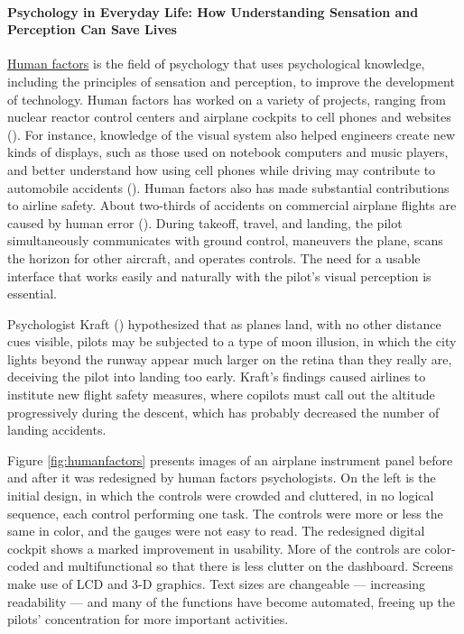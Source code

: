 \documentclass[
]{krantz}
\begin{document}
\paragraph*{Psychology in Everyday Life: How Understanding Sensation and Perception Can Save Lives}\label{psychology-in-everyday-life-how-understanding-sensation-and-perception-can-save-lives}

\hyperref[human-factors]{Human factors} is the field of psychology that uses psychological knowledge, including the principles of sensation and perception, to improve the development of technology. Human factors has worked on a variety of projects, ranging from nuclear reactor control centers and airplane cockpits to cell phones and websites (). For instance, knowledge of the visual system also helped engineers create new kinds of displays, such as those used on notebook computers and music players, and better understand how using cell phones while driving may contribute to automobile accidents (). Human factors also has made substantial contributions to airline safety. About two-thirds of accidents on commercial airplane flights are caused by human error (). During takeoff, travel, and landing, the pilot simultaneously communicates with ground control, maneuvers the plane, scans the horizon for other aircraft, and operates controls. The need for a usable interface that works easily and naturally with the pilot's visual perception is essential.

Psychologist Kraft () hypothesized that as planes land, with no other distance cues visible, pilots may be subjected to a type of moon illusion, in which the city lights beyond the runway appear much larger on the retina than they really are, deceiving the pilot into landing too early. Kraft's findings caused airlines to institute new flight safety measures, where copilots must call out the altitude progressively during the descent, which has probably decreased the number of landing accidents.

Figure \ref{fig:humanfactors} presents images of an airplane instrument panel before and after it was redesigned by human factors psychologists. On the left is the initial design, in which the controls were crowded and cluttered, in no logical sequence, each control performing one task. The controls were more or less the same in color, and the gauges were not easy to read. The redesigned digital cockpit shows a marked improvement in usability. More of the controls are color-coded and multifunctional so that there is less clutter on the dashboard. Screens make use of LCD and 3-D graphics. Text sizes are changeable --- increasing readability --- and many of the functions have become automated, freeing up the pilots' concentration for more important activities.
\end{document}
